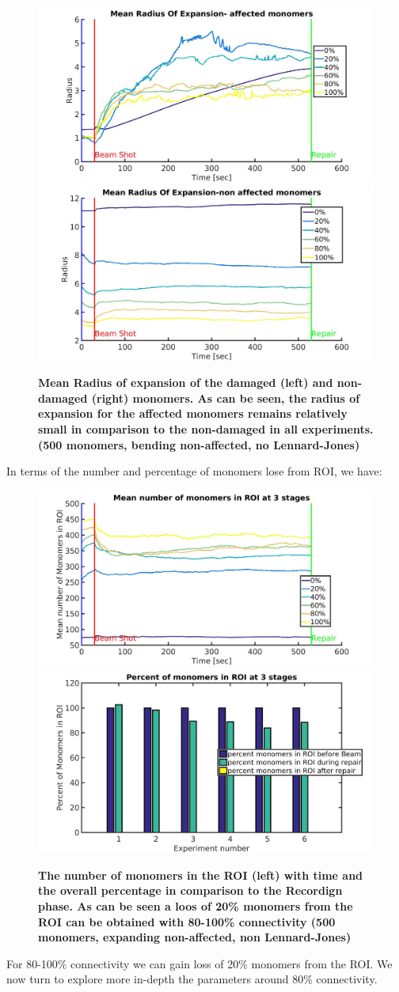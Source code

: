 \documentclass[12pt]{report}
\begin{document}
	\begin{figure}[H]
	\includegraphics[width=0.5\linewidth, height=0.3\textheight]{Images/expandNonDamaged/BreakAffectedCrosslinks/04/MeanRadiusOfExpansionAffected}
    \includegraphics[width=0.5\linewidth, height=0.3\textheight]{Images/expandNonDamaged/BreakAffectedCrosslinks/04/MeanRadiusOfExpansionNonAffected}
	\caption{\tiny{\textbf{Mean Radius of expansion of the damaged (left) and non-damaged (right) monomers. As can be seen,  the radius of expansion for the affected monomers remains relatively small in comparison to the non-damaged in all experiments. (500 monomers, bending non-affected, no Lennard-Jones)}}}
	\label{fig:MeanRadiusOfExpansionAffected}
	\end{figure}
	     
	In terms of the number and percentage of monomers lose from ROI, we have:
	\begin{figure}[H]
	\includegraphics[width=0.5\linewidth, height=0.3\textheight]{Images/expandNonDamaged/BreakAffectedCrosslinks/04/MeanNumMonomersInROI}
	\includegraphics[width=0.5\linewidth, height=0.3\textheight]{Images/expandNonDamaged/BreakAffectedCrosslinks/04/percentOfMonomersInROI}
	\caption{\tiny{\textbf{The number of monomers in the ROI (left) with time and the overall percentage in comparison to the Recordign phase. As can be seen a loos of 20\% monomers from the ROI can be obtained with 80-100\% connectivity  (500 monomers, expanding non-affected, non Lennard-Jones)}}}
	\label{fig:MeanNumMonomersInROI}
	\end{figure}
	     For 80-100\% connectivity we can gain loss of 20\% monomers from the ROI. We now turn to explore more in-depth the parameters around 80\% connectivity. 
	     										
\end{document}
